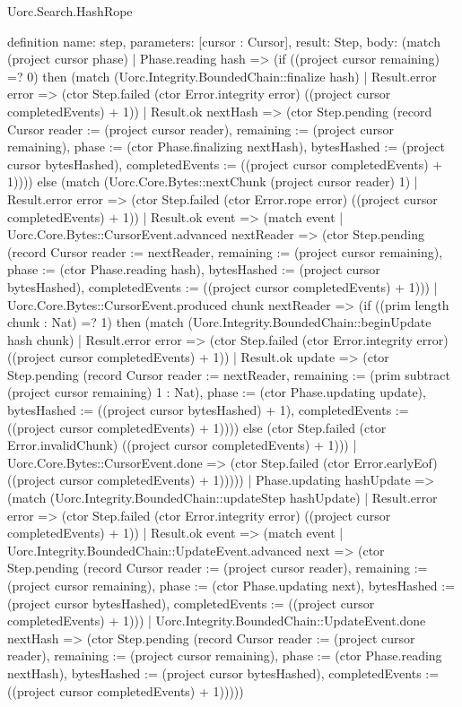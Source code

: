 \begin{lexlean}{Uorc.Search.HashRope}
\begin{semanticmodule}
definition{
  name: step,
  parameters: [cursor : Cursor],
  result: Step,
  body: (match (project cursor phase)
    | Phase.reading hash => (if ((project cursor remaining) =? 0) then (match (Uorc.Integrity.BoundedChain::finalize hash)
      | Result.error error => (ctor Step.failed (ctor Error.integrity error) ((project cursor completedEvents) + 1))
      | Result.ok nextHash => (ctor Step.pending (record Cursor {reader := (project cursor reader), remaining := (project cursor remaining), phase := (ctor Phase.finalizing nextHash), bytesHashed := (project cursor bytesHashed), completedEvents := ((project cursor completedEvents) + 1)}))) else (match (Uorc.Core.Bytes::nextChunk (project cursor reader) 1)
      | Result.error error => (ctor Step.failed (ctor Error.rope error) ((project cursor completedEvents) + 1))
      | Result.ok event => (match event
        | Uorc.Core.Bytes::CursorEvent.advanced nextReader => (ctor Step.pending (record Cursor {reader := nextReader, remaining := (project cursor remaining), phase := (ctor Phase.reading hash), bytesHashed := (project cursor bytesHashed), completedEvents := ((project cursor completedEvents) + 1)}))
        | Uorc.Core.Bytes::CursorEvent.produced chunk nextReader => (if ((prim length chunk : Nat) =? 1) then (match (Uorc.Integrity.BoundedChain::beginUpdate hash chunk)
          | Result.error error => (ctor Step.failed (ctor Error.integrity error) ((project cursor completedEvents) + 1))
          | Result.ok update => (ctor Step.pending (record Cursor {reader := nextReader, remaining := (prim subtract (project cursor remaining) 1 : Nat), phase := (ctor Phase.updating update), bytesHashed := ((project cursor bytesHashed) + 1), completedEvents := ((project cursor completedEvents) + 1)}))) else (ctor Step.failed (ctor Error.invalidChunk) ((project cursor completedEvents) + 1)))
        | Uorc.Core.Bytes::CursorEvent.done => (ctor Step.failed (ctor Error.earlyEof) ((project cursor completedEvents) + 1)))))
    | Phase.updating hashUpdate => (match (Uorc.Integrity.BoundedChain::updateStep hashUpdate)
      | Result.error error => (ctor Step.failed (ctor Error.integrity error) ((project cursor completedEvents) + 1))
      | Result.ok event => (match event
        | Uorc.Integrity.BoundedChain::UpdateEvent.advanced next => (ctor Step.pending (record Cursor {reader := (project cursor reader), remaining := (project cursor remaining), phase := (ctor Phase.updating next), bytesHashed := (project cursor bytesHashed), completedEvents := ((project cursor completedEvents) + 1)}))
        | Uorc.Integrity.BoundedChain::UpdateEvent.done nextHash => (ctor Step.pending (record Cursor {reader := (project cursor reader), remaining := (project cursor remaining), phase := (ctor Phase.reading nextHash), bytesHashed := (project cursor bytesHashed), completedEvents := ((project cursor completedEvents) + 1)}))))
}
\end{semanticmodule}
\end{lexlean}
